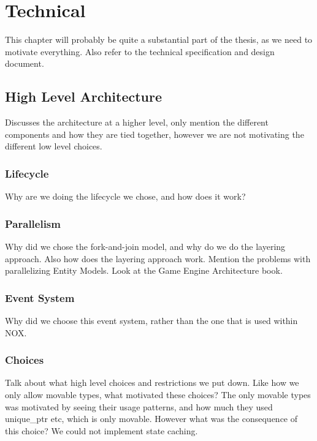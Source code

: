 \chapter{Technical}
\label{chap:technical}
This chapter will probably be quite a substantial part of the thesis, as we need to motivate everything.
Also refer to the technical specification and design document.

\section{High Level Architecture}
Discusses the architecture at a higher level, only mention the different components and how they are tied together,
however we are not motivating the different low level choices.

\subsection{Lifecycle}
Why are we doing the lifecycle we chose, and how does it work?

\subsection{Parallelism}
Why did we chose the fork-and-join model, and why do we do the layering approach.
Also how does the layering approach work.
Mention the problems with parallelizing Entity Models.
Look at the Game Engine Architecture book.

\subsection{Event System}
Why did we choose this event system, rather than the one that is used within NOX.

\subsection{Choices}
Talk about what high level choices and restrictions we put down.
Like how we only allow movable types, what motivated these choices?
The only movable types was motivated by seeing their usage patterns, and how much they used unique\_ptr etc, which is only movable.
However what was the consequence of this choice? We could not implement state caching.

